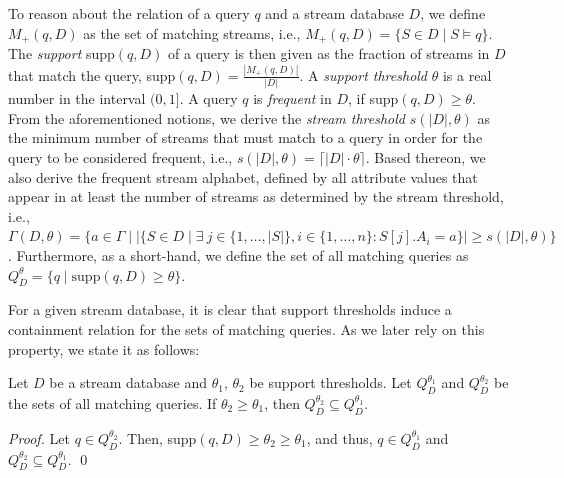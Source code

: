  To reason about the relation of a query
$q$ and a stream database $D$, we
define $M_+(q,D)$ as the
set of matching streams, i.e., $M_+(q,D) = \{S \in D \mid
S \models q\}$.
The \emph{support} supp$(q,D)$ of a query is then given as
the fraction of streams in $D$ that match the query,
supp$(q,D)= \frac{|M_+(q,D)|}{|D|}$.
A \emph{support threshold} $\theta$ is a real number in
the interval $(0,1]$.
A query $q$ is \emph{frequent} in $D$, if supp$(q,D) \geq
\theta$.
From the aforementioned notions, we derive the
\emph{stream threshold} $s(|D|,\theta)$ as the minimum
number of streams
that must match to a query in order for the query to be
considered frequent, i.e., $s(|D|,\theta) = \lceil |D| \cdot
\theta \rceil$.
Based thereon, we also derive the frequent stream alphabet, defined by all
attribute values that appear in at least the number of streams as
determined by the stream threshold, i.e., $\Gamma(D,\theta) = \{a \in
\Gamma \mid |\{S \in D \mid \exists \ j\in\{1,\dots,|S|\},
i\in\{1,\dots,n\}: S[j].A_i = a\}| \geq s(|D|,\theta)\}$.
Furthermore, as a short-hand,
we define the set of all matching queries as $Q_D^{\theta}
= \{q \mid \text{supp}(q,D) \geq \theta\}$.

For a given stream database, it is clear that support
thresholds induce a containment relation for the sets of
matching queries. As we later rely on this property, we
state it as follows:

\begin{property}
\label{prop:subset}
Let $D$ be a stream database and $\theta_1$, $\theta_2$ be support thresholds. %
Let $Q_D^{\theta_1}$ and $Q_D^{\theta_2}$ be the sets of all matching queries. %
If $\theta_2 \geq \theta_1$, then $Q_D^{\theta_2} \subseteq Q_D^{\theta_1}$.
\end{property}
\textit{Proof.}
    Let $q \in Q_D^{\theta_2}$. Then, supp$(q,D) \geq
    \theta_2 \geq \theta_1$, and thus, $q \in
    Q_D^{\theta_1}$
    and $Q_D^{\theta_2} \subseteq
    Q_D^{\theta_1}. $ \hfill \qed


